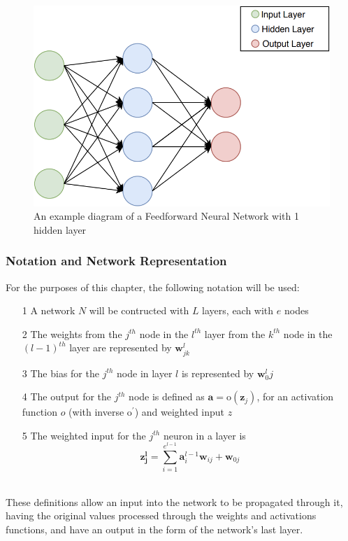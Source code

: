 \documentclass[a4paper,11pt,oneside]{article}
\theoremstyle{plain}
\theoremstyle{definition}
\begin{document}
	\begin{figure}[H]
		\centering 
		\includegraphics[scale=0.5]{images/implementation/neural_network_diagram.png}
		\caption[Feedforward Neural Network Diagram]{An example diagram of a Feedforward Neural Network with 1 hidden layer}
		\label{figure-neural_network_diagram}
	\end{figure}		
	
	\subsubsection{Notation and Network Representation}\label{imp_ffn_functions}
	
	For the purposes of this chapter, the following notation will be used:
	
	\begin{itemize}
		\item[1] A network $N$ will be contructed with $L$ layers, each with $e$ nodes
		\item[2] The weights from the $j^{th}$ node in the $l^{th}$ layer from the $k^{th}$ node in the $(l-1)^{th}$ layer are represented by $\mathbf{w}^l_{jk}$
		\item[3] The bias for the $j^{th}$ node in layer $l$ is represented by $\mathbf{w}^l_0j$
		\item[4] The output for the $j^{th}$ node is defined as $\mathbf{a} = \mathrm{o}(\mathbf{z}_j)$, for an activation function $o$ (with inverse $\mathrm{o^{\prime}}$) and weighted input $z$
		\item[5] The weighted input for the $j^{th}$ neuron in a layer is 
		\begin{equation}\label{eq_weighted_input}
		\mathbf{z^l_j}=\sum_{i=1}^{e^{l-1}}{\mathbf{a}^{l-1}_i\mathbf{w}_{ij}} + \mathbf{w}_{0j}
		\end{equation}
	\end{itemize}
	~\\
	These definitions allow an input into the network to be propagated through it, having the original values processed through the weights and activations functions, and have an output in the form of the network's last layer.
	
\end{document}
